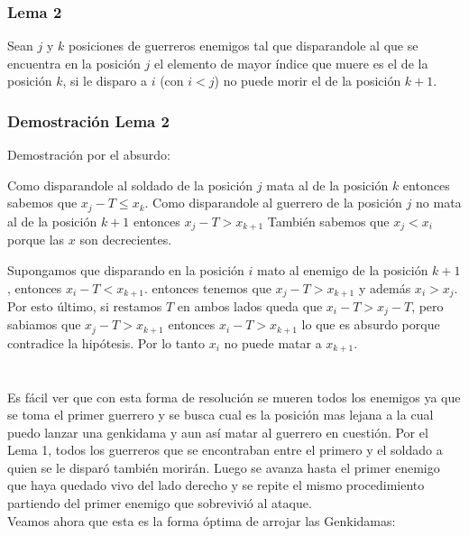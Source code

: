     		\subsubsection*{Lema 2}

    			Sean $j$ y $k$ posiciones de guerreros enemigos tal que disparandole al que se encuentra en la posición $j$ el elemento de mayor índice que muere es el de la posición $k$, si le disparo a $i$ (con $i < j$) no puede morir el de la posición $k+1$.


    		\subsubsection*{Demostración Lema 2}
    			Demostración por el absurdo:

    			Como disparandole al soldado de la posición $j$ mata al de la posición $k$ entonces sabemos que $x_{j} - T \leq x_{k}$.
    			Como disparandole al guerrero de la posición $j$ no mata al de la posición $k+1$ entonces $x_{j} - T > x_{k+1}$
    			También sabemos que $x_{j} < x_{i}$ porque las $x$ son decrecientes.

    			Supongamos que disparando en la posición $i$ mato al enemigo de la posición $k+1$, entonces $x_{i} - T < x_{k+1}$.
    			entonces tenemos que $x_{j} - T > x_{k+1}$ y además $x_{i} > x_{j}$. Por esto último, si restamos $T$ en ambos lados queda que $x_{i} - T > x_{j} - T$, pero sabiamos que $x_{j} - T > x_{k+1}$ entonces $x_{i} - T > x_{k+1}$ lo que es absurdo porque contradice la hipótesis. 
    			Por lo tanto $x_{i}$ no puede matar a $x_{k+1}$. \\
    			\\
    			\\


		Es fácil ver que con esta forma de resolución se mueren todos los enemigos ya que se toma el primer guerrero y se busca cual es la posición mas lejana a la cual puedo lanzar una genkidama y aun así matar al guerrero en cuestión. Por el Lema 1, todos los guerreros que se encontraban entre el primero y el soldado a quien se le disparó también morirán. Luego se avanza hasta el primer enemigo que haya quedado vivo del lado derecho y se repite el mismo procedimiento partiendo del primer enemigo que sobrevivió al ataque. \\ 


		Veamos ahora que esta es la forma óptima de arrojar las Genkidamas:\\


